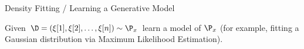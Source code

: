 \begin{frame}{Density Fitting / Learning a Generative Model}


Given  $\D = \left(\xi[1], \xi[2],\dots, \xi[n] \right) \sim \P_x$ learn a model of $\P_x$ (for example, fitting a Gaussian distribution via Maximum Likelihood Estimation). 

\pause
{}

\end{frame}


